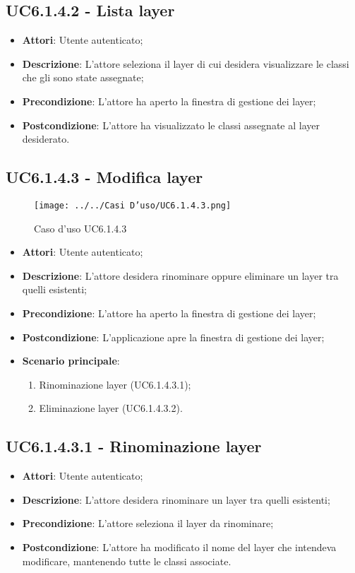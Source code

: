 \subsection{UC6.1.4.2 - Lista layer} 
\label{ssec:UC6.1.4.2} 
\begin{itemize} 
\item \textbf{Attori}: Utente autenticato;
\item \textbf{Descrizione}: L'attore seleziona il layer di cui desidera visualizzare le classi che gli sono state assegnate;
\item \textbf{Precondizione}: L'attore ha aperto la finestra di gestione dei layer;
\item \textbf{Postcondizione}: L'attore ha visualizzato le classi assegnate al layer desiderato.
\end{itemize} 
\newpage
\subsection{UC6.1.4.3 - Modifica layer} 
\label{ssec:UC6.1.4.3} 
\begin{figure}[h!] 
\centering 
\texttt{[image: ../../Casi D'uso/UC6.1.4.3.png]} 
\caption{Caso d'uso UC6.1.4.3} 
 \end{figure} 
\begin{itemize} 
\item \textbf{Attori}: Utente autenticato;
\item \textbf{Descrizione}: L'attore desidera rinominare oppure eliminare un layer tra quelli esistenti;
\item \textbf{Precondizione}: L'attore ha aperto la finestra di gestione dei layer;
\item \textbf{Postcondizione}: L'applicazione apre la finestra di gestione dei layer;
\item \textbf{Scenario principale}: \begin{enumerate}\item Rinominazione layer (UC6.1.4.3.1);\item Eliminazione layer (UC6.1.4.3.2). 
 \end{enumerate}
\end{itemize} 
\subsection{UC6.1.4.3.1 - Rinominazione layer} 
\label{ssec:UC6.1.4.3.1} 
\begin{itemize} 
\item \textbf{Attori}: Utente autenticato;
\item \textbf{Descrizione}: L'attore desidera rinominare un layer tra quelli esistenti;
\item \textbf{Precondizione}: L'attore seleziona il layer da rinominare;
\item \textbf{Postcondizione}: L'attore ha modificato il nome del layer che intendeva modificare, mantenendo tutte le classi associate.
\end{itemize} 
